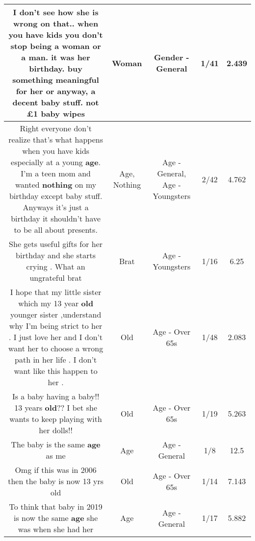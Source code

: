 \documentclass[11pt]{article}
\newlength\mylength
\begin{document}
\begin{center}
\begin{longtable}{|C{.65\mylength}|C{.30\mylength}|C{.12\mylength}|C{.12\mylength}|C{.12\mylength}|}
  \small I don't see how she is wrong on that.. when you have kids you don't stop being a \textbf{woman} or a man. it was her birthday. buy something meaningful for her or anyway, a decent baby stuff. not £1 baby wipes\normalsize   & Woman & Gender - General & 1/41 & 2.439 \\  \hline
  \small Right everyone don't realize that's what happens when you have kids especially at a young \textbf{age}. I'm a teen mom and wanted \textbf{nothing} on my birthday except baby stuff. Anyways it's just a birthday it shouldn't have to be all about presents.\normalsize   & Age, Nothing & Age - General, Age - Youngsters & 2/42 & 4.762 \\  \hline
  \small She gets useful gifts for her birthday and she starts crying . What an ungrateful brat\normalsize   & Brat & Age - Youngsters & 1/16 & 6.25 \\  \hline
  \small I hope that my little sister which my 13 year \textbf{old} younger sister ,understand why I'm being strict to her . I just love her and I don't want her to choose a wrong path in her life . I don't want like this happen to her .\normalsize   & Old & Age - Over 65s & 1/48 & 2.083 \\  \hline
  \small Is a baby  having a baby!! 13 years \textbf{old}?? I bet she wants to keep playing with her dolls!!\normalsize   & Old & Age - Over 65s & 1/19 & 5.263 \\  \hline
  \small The baby is the same \textbf{age} as me\normalsize   & Age & Age - General & 1/8 & 12.5 \\  \hline
  \small Omg if this was in 2006 then the baby is now 13 yrs old\normalsize   & Old & Age - Over 65s & 1/14 & 7.143 \\  \hline
  \small To think that baby in 2019  is now the same \textbf{age} she was when she had her\normalsize   & Age & Age - General & 1/17 & 5.882 \\  \hline

\end{longtable}
\end{center}
\end{document}
